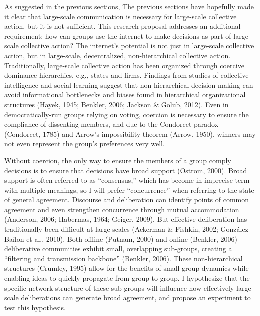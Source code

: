 As suggested in the previous sections, The previous sections have hopefully made it clear that large-scale communication is necessary for large-scale collective action, but it is not sufficient. This research proposal addresses an additional requirement: how can groups use the internet to make decisions as part of large-scale collective action? The internet’s potential is not just in large-scale collective action, but in large-scale, decentralized, non-hierarchical collective action. Traditionally, large-scale collective action has been organized through coercive dominance hierarchies, e.g., states and firms. Findings from studies of collective intelligence and social learning suggest that non-hierarchical decision-making can avoid informational bottlenecks and biases found in hierarchical organizational structures (Hayek, 1945; Benkler, 2006; Jackson \& Golub, 2012). Even in democratically-run groups relying on voting, coercion is necessary to ensure the compliance of dissenting members, and due to the Condorcet paradox (Condorcet, 1785) and Arrow’s impossibility theorem (Arrow, 1950), winners may not even represent the group’s preferences very well.

Without coercion, the only way to ensure the members of a group comply decisions is to ensure that decisions have broad support (Ostrom, 2000). Broad support is often referred to as “consensus,” which has become in imprecise term with multiple meanings, so I will prefer “concurrence” when referring to the state of general agreement. Discourse and deliberation can identify points of common agreement and even strengthen concurrence through mutual accommodation (Anderson, 2006; Habermas, 1964; Geiger, 2009). But effective deliberation has traditionally been difficult at large scales (Ackerman \& Fishkin, 2002; Gonz\'alez-Ba\'ilon et al., 2010). Both offline (Putnam, 2000) and online (Benkler, 2006) deliberative communities exhibit small, overlapping sub-groups, creating a “filtering and transmission backbone” (Benkler, 2006). These non-hierarchical structures (Crumley, 1995) allow for the benefits of small group dynamics while enabling ideas to quickly propagate from group to group. I hypothesize that the specific network structure of these sub-groups will influence how effectively large-scale deliberations can generate broad agreement, and propose an experiment to test this hypothesis.

